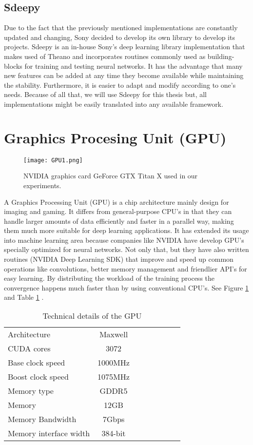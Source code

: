 \subsection{Sdeepy}
Due to the fact that the previously mentioned implementations are constantly updated and changing, Sony decided to develop its own library to develop its projects. Sdeepy is an in-house Sony's deep learning library implementation that makes used of Theano and incorporates routines commonly used as building-blocks for training and testing neural networks. It has the advantage that many new features can be added at any time they become available while maintaining the stability. Furthermore, it is easier to adapt and modify according to one's needs. Because of all that, we will use Sdeepy for this thesis but, all implementations might be easily translated into any available framework.
\section{Graphics Procesing Unit (GPU)}
\begin{figure}[tb] 
\centering 
\texttt{[image: GPU1.png]} 
\caption[GPU for deep learning]{NVIDIA graphics card GeForce GTX Titan X used in our experiments.}
\label{fig:GPUim1} 
\end{figure}
A Graphics Processing Unit (GPU) is a chip architecture mainly design for imaging and gaming. It differs from general-purpose CPU's in that they can handle larger amounts of data efficiently and faster in a parallel way, making them much more suitable for deep learning applications. It has extended its usage into machine learning area because companies like NVIDIA have develop GPU's specially optimized for neural networks. Not only that, but they have also written routines (NVIDIA Deep Learning SDK) that improve and speed up common operations like convolutions, better memory management and friendlier API's for easy learning. By distributing the workload of the training process the convergence happens much faster than by using conventional CPU's. See Figure \ref{fig:GPUim1} and Table \ref{tab:GPU1} .

\begin{table}[tb]
\caption[Technical speficications of GeForce GTX Titan]{Technical details of the GPU}
\label{tab:GPU1}
\centering
\begin{tabular}{l*{6}{c}r}
\hline
Architecture   & Maxwell\\
CUDA cores   & 3072\\
Base clock speed   & 1000MHz\\
Boost clock speed   & 1075MHz\\
Memory type   & GDDR5\\
Memory    & 12GB\\
Memory Bandwidth    & 7Gbps\\
Memory interface width    & 384-bit\\
\bottomrule 
\end{tabular}  
\end{table}

